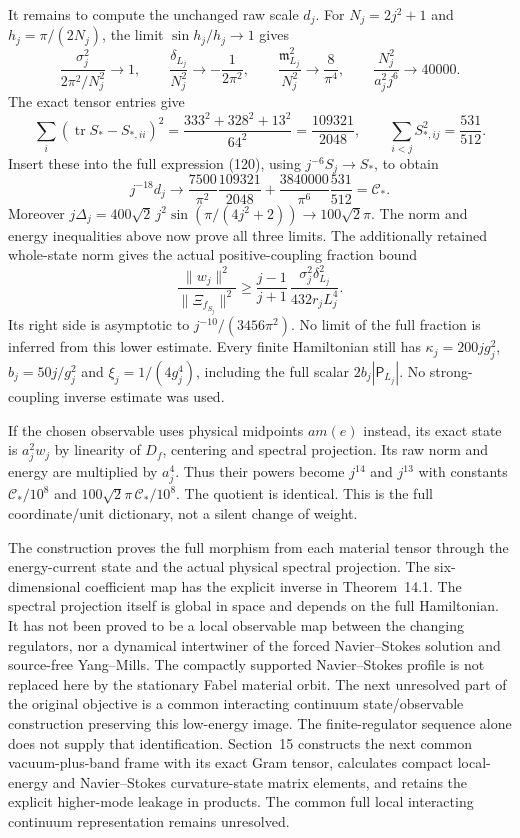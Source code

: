 \documentclass[11pt]{article}
\begin{document}
It remains to compute the unchanged raw scale $d_j$.
For $N_j=2j^2+1$ and $h_j=\pi/(2N_j)$, the limit
$\sin h_j/h_j\to1$ gives
\[
 \frac{\sigma_j^2}{2\pi^2/N_j^2}\to1,\qquad
 \frac{\delta_{L_j}}{N_j^2}\to-\frac1{2\pi^2},\qquad
 \frac{\mathfrak m_{L_j}^2}{N_j^2}\to\frac8{\pi^4},
 \qquad \frac{N_j^2}{a_j^2j^6}\to40000.
\]
The exact tensor entries give
\[
 \sum_i(\operatorname{tr}S_*-S_{*,ii})^2
 =\frac{333^2+328^2+13^2}{64^2}=\frac{109321}{2048},
 \qquad
 \sum_{i<j}S_{*,ij}^2=\frac{531}{512}.
\]
Insert these into the full expression (120), using
$j^{-6}S_j\to S_*$, to obtain
\[
 j^{-18}d_j\to
 \frac{7500}{\pi^2}\frac{109321}{2048}
 +\frac{3840000}{\pi^6}\frac{531}{512}=\mathcal C_* .
\]
Moreover
$j\Delta_j=400\sqrt2\,j^2\sin(\pi/(4j^2+2))
\to100\sqrt2\pi$.
The norm and energy inequalities above now prove all three limits.
The additionally retained whole-state norm gives the actual
positive-coupling fraction bound
\[
 \frac{\|w_j\|^2}{\|\Xi_{f_{S_j}}\|^2}
 \ge\frac{j-1}{j+1}\,
 \frac{\sigma_j^2\delta_{L_j}^2}{432r_jL_j^4}.
\]
Its right side is asymptotic to
$j^{-10}/(3456\pi^2)$. No limit of the full fraction is inferred
from this lower estimate.
Every finite Hamiltonian still has
$\kappa_j=200jg_j^2$, $b_j=50j/g_j^2$ and
$\xi_j=1/(4g_j^4)$, including the full scalar $2b_j|\mathsf P_{L_j}|$.
No strong-coupling inverse estimate was used.



If the chosen observable uses physical midpoints $am(e)$ instead,
its exact state is $a_j^2w_j$ by linearity of $D_f$, centering and
spectral projection. Its raw norm and energy are multiplied by $a_j^4$.
Thus their powers become $j^{14}$ and $j^{13}$ with constants
$\mathcal C_*/10^8$ and $100\sqrt2\pi\,\mathcal C_*/10^8$.
The quotient is identical. This is the full coordinate/unit dictionary,
not a silent change of weight.

The construction proves the full morphism from each material tensor
through the energy-current state and the actual physical spectral
projection. The six-dimensional coefficient map has the explicit
inverse in Theorem~14.1.
The spectral projection itself is global in space and depends on the
full Hamiltonian. It has not been proved to be a local observable map
between the changing regulators, nor a dynamical intertwiner of the
forced Navier--Stokes solution and source-free Yang--Mills.
The compactly supported Navier--Stokes profile is not replaced here by
the stationary Fabel material orbit. The next unresolved part of the
original objective is a common interacting continuum state/observable
construction preserving this low-energy image. The finite-regulator
sequence alone does not supply that identification.
Section~15 constructs the next common
vacuum-plus-band frame with its exact Gram tensor, calculates compact
local-energy and Navier--Stokes curvature-state matrix elements, and
retains the explicit higher-mode leakage in products. The common
full local interacting continuum representation remains unresolved.
\end{document}
